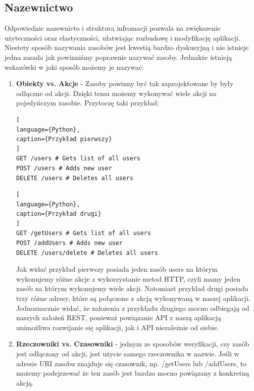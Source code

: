 \documentclass[oneside,polski,logo,indent]{amuthesis}
\begin{document}
\begin{enumerate}
\begin{enumerate}
\begin{center}
\subsection{Nazewnictwo}
\end{center}

Odpowiednie nazewnicto i struktura infromacji pozwala na zwiększenie użyteczności oraz elastyczności, ułatwiając rozbudowę i modyfikację aplikacji. Niestety sposób nazywania zasobów jest kwestią bardzo dyskusyjną i nie istnieje jedna zasada jak powinniśmy poprawnie nazywać zasoby. Jednakże istnieją wskazówki w jaki sposób możemy je nazywać:\newline

\begin{enumerate}
\item \textbf{Obiekty vs. Akcje} - Zasoby powinny być tak zaprojektowane by były odłączne od akcji. Dzięki temu możemy wykonywać wiele akcji na pojedyńczym zasobie. Przytoczę taki przykład:\newline
\begin{lstlisting}[
language={Python},
caption={Przykład pierwszy}
]
GET /users # Gets list of all users
POST /users # Adds new user
DELETE /users # Deletes all users
\end{lstlisting}

\begin{lstlisting}[
language={Python},
caption={Przykład drugi}
]
GET /getUsers # Gets list of all users
POST /addUsers # Adds new user
DELETE /users/delete # Deletes all users
\end{lstlisting}

Jak widać przykład pierwszy posiada jeden zasób users na którym wykonujemy różne akcje z wykorzystanie metod HTTP, czyli mamy jeden zasób na którym wykonujemy wiele akcji. Natomiast przykład drugi posiada trzy różne adresy, które są połączone z akcją wykonywaną w naszej aplikacji. Jednoznacznie widać, że założenia z przykładu drugiego mocno odbiegają od naszych założeń REST, ponieważ powiązanie API z naszą aplikacją unimożliwa rozwijanie się aplikacji, jak i API niezależnie od siebie.\newline

\item \textbf{Rzeczowniki vs. Czasowniki} - jednym ze sposobów weryfikacji, czy zasób jest odłączony od akcji, jest użycie samego rzeczownika w nazwie. Jeśli w adresie URI zasobu znajduje się czasownik, np. /getUsers lub /addUsers, to możemy podejrzewać że ten zasób jest bardzo mocno powiązany z konkretną akcją.\newline


\end{enumerate}
\end{enumerate}
\end{enumerate}
\end{document}
